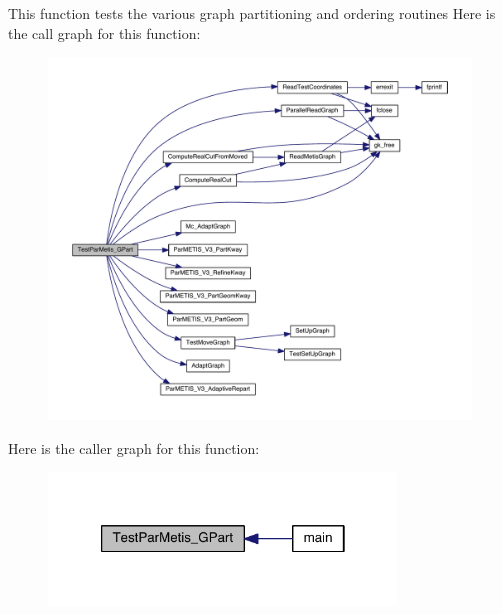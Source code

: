 This function tests the various graph partitioning and ordering routines Here is the call graph for this function\+:\nopagebreak
\begin{figure}[H]
\begin{center}
\leavevmode
\includegraphics[width=350pt]{a00954_adb0c2dc0c5138f35c71739328c702074_cgraph}
\end{center}
\end{figure}
Here is the caller graph for this function\+:\nopagebreak
\begin{figure}[H]
\begin{center}
\leavevmode
\includegraphics[width=262pt]{a00954_adb0c2dc0c5138f35c71739328c702074_icgraph}
\end{center}
\end{figure}
\mbox{\label{a00954_a7a8b23842a3717196aec03bb4b8704bd}} 
